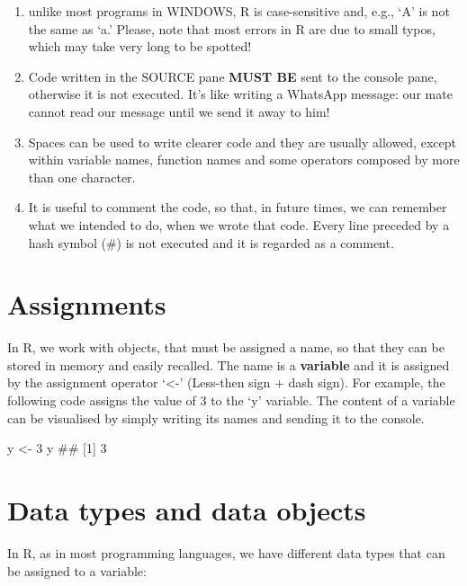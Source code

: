 \documentclass[a4paper,12pt,oneside]{book}
\providecommand{\tightlist}{%
  \setlength{\itemsep}{0pt}\setlength{\parskip}{0pt}}
\newenvironment{Shaded}{\begin{snugshade}}{\end{snugshade}}
\newcommand{\DecValTok}[1]{#1}
\newcommand{\DocumentationTok}[1]{#1}
\newcommand{\OtherTok}[1]{#1}
\newcommand{\NormalTok}[1]{#1}
\begin{document}
\begin{enumerate}
\def\labelenumi{\arabic{enumi}.}
\tightlist
\item
  unlike most programs in WINDOWS, R is case-sensitive and, e.g., `A' is not the same as `a.' Please, note that most errors in R are due to small typos, which may take very long to be spotted!
\item
  Code written in the SOURCE pane \textbf{MUST BE} sent to the console pane, otherwise it is not executed. It's like writing a WhatsApp message: our mate cannot read our message until we send it away to him!
\item
  Spaces can be used to write clearer code and they are usually allowed, except within variable names, function names and some operators composed by more than one character.
\item
  It is useful to comment the code, so that, in future times, we can remember what we intended to do, when we wrote that code. Every line preceded by a hash symbol (\#) is not executed and it is regarded as a comment.
\end{enumerate}

\hypertarget{assignments}{%
\section{Assignments}\label{assignments}}

In R, we work with objects, that must be assigned a name, so that they can be stored in memory and easily recalled. The name is a \textbf{variable} and it is assigned by the assignment operator `\textless-' (Less-then sign + dash sign). For example, the following code assigns the value of 3 to the `y' variable. The content of a variable can be visualised by simply writing its names and sending it to the console.

\begin{Shaded}
\begin{Highlighting}[]
\NormalTok{y  }\OtherTok{\textless{}{-}}  \DecValTok{3}
\NormalTok{y}
\DocumentationTok{\#\# [1] 3}
\end{Highlighting}
\end{Shaded}

\hypertarget{data-types-and-data-objects}{%
\section{Data types and data objects}\label{data-types-and-data-objects}}

In R, as in most programming languages, we have different data types that can be assigned to a variable:
\end{document}
